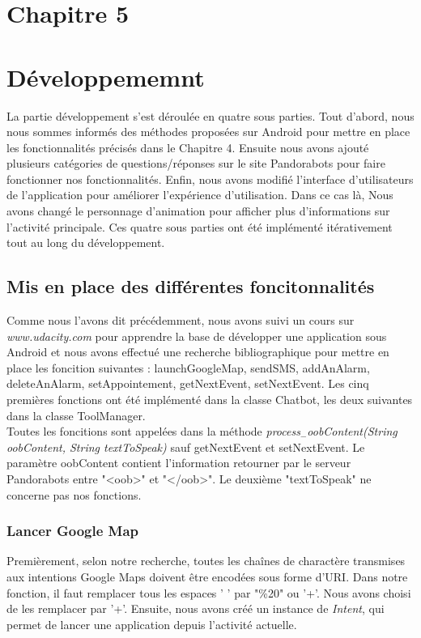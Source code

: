 \section*{Chapitre 5}
\section{Développememnt}
	La partie développement s'est déroulée en quatre sous parties. Tout d'abord, nous nous sommes informés des méthodes proposées sur Android pour mettre en place les fonctionnalités précisés dans le Chapitre 4. Ensuite nous avons ajouté plusieurs catégories de questions/réponses sur le site Pandorabots pour faire fonctionner nos fonctionnalités. Enfin, nous avons modifié l'interface d'utilisateurs de l'application pour améliorer l'expérience d'utilisation. Dans ce cas là, Nous avons changé le personnage d'animation pour afficher plus d'informations sur l'activité principale. Ces quatre sous parties ont été implémenté itérativement tout au long du développement.

\subsection{Mis en place des différentes foncitonnalités}
	
\indent Comme nous l'avons dit précédemment, nous avons suivi un cours sur \emph{www.udacity.com} pour apprendre la base de développer une application sous Android et nous avons effectué une recherche bibliographique pour mettre en place les foncition suivantes : launchGoogleMap, sendSMS, addAnAlarm, deleteAnAlarm, setAppointement, getNextEvent, setNextEvent. Les cinq premières fonctions ont été implémenté dans la classe Chatbot, les deux suivantes dans la classe ToolManager.\\
\indent Toutes les foncitions sont appelées dans la méthode \emph{process$_-$oobContent(String oobContent, String textToSpeak)} sauf getNextEvent et setNextEvent. Le paramètre oobContent contient l'information retourner par le serveur Pandorabots entre "<oob>" et "</oob>". Le deuxième "textToSpeak" ne concerne pas nos fonctions.

\subsubsection{Lancer Google Map}

\indent Premièrement, selon notre recherche, toutes les chaînes de charactère transmises aux intentions Google Maps doivent être encodées sous forme d'URI. Dans notre fonction, il faut remplacer tous les espaces ' ' par "\%20" ou '+'. Nous avons choisi de les remplacer par '+'. Ensuite, nous avons créé un instance de \emph{Intent}, qui permet de lancer une application depuis l'activité actuelle. 

